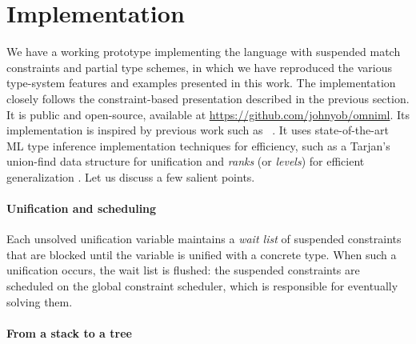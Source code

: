 \documentclass[acmsmall,screen,nonacm%
\Anonymous{,anonymous}{}%
\Final{}{,review}%
]{acmart}
\begin{document}
\section{Implementation}
\label{sec:implementation}

We have a working prototype implementing the \OML language with suspended
match constraints and partial type schemes, in which we have reproduced the
various type-system features and examples presented in this work. The
implementation  closely follows the constraint-based presentation described 
in the previous section.
%
It is public and open-source, available at
\url{https://github.com/johnyob/omniml}. Its implementation is inspired by
previous work such as \Inferno~\citep {Pottier/inferno@icfp2014,
Pottier/inferno@opam}. It uses state-of-the-art ML type inference
implementation techniques for efficiency, such as a Tarjan's union-find data
structure for unification \citep*{journals/jacm/Tarjan75} and \emph{ranks} (or
\emph{levels}) for efficient generalization \citep*{Remy/mleth}. Let us discuss
a few salient points.

\paragraph{Unification and scheduling}

Each unsolved unification variable maintains a \emph{wait list} of suspended
constraints that are blocked until the variable is unified with a concrete
type. When such a unification occurs, the wait list is flushed: the suspended
constraints are scheduled on the global constraint scheduler, which is
responsible for eventually solving them.

\paragraph{From a stack to a tree}


\end{document}

